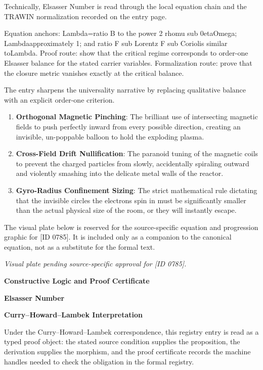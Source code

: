 Technically, Elsasser Number is read through the local equation chain and the TRAWIN normalization recorded on the entry page.

Equation anchors: Lambda=ratio B to the power 2 rhomu sub 0etaOmega; Lambdaapproximately 1; and ratio F sub Lorentz F sub Coriolis similar toLambda. Proof route: show that the critical regime corresponds to order-one Elsasser balance for the stated carrier variables. Formalization route: prove that the closure metric vanishes exactly at the critical balance.

The entry sharpens the universality narrative by replacing qualitative balance with an explicit order-one criterion.
\endgroup

\begin{enumerate}[leftmargin=1.6em,itemsep=6pt,topsep=4pt]
\item \textbf{Orthogonal Magnetic Pinching}: The brilliant use of intersecting magnetic fields to push perfectly inward from every possible direction, creating an invisible, un-poppable balloon to hold the exploding plasma.
\item \textbf{Cross-Field Drift Nullification}: The paranoid tuning of the magnetic coils to prevent the charged particles from slowly, accidentally spiraling outward and violently smashing into the delicate metal walls of the reactor.
\item \textbf{Gyro-Radius Confinement Sizing}: The strict mathematical rule dictating that the invisible circles the electrons spin in must be significantly smaller than the actual physical size of the room, or they will instantly escape.
\end{enumerate}

\begingroup\footnotesize\sloppy
The visual plate below is reserved for the source-specific equation and progression graphic for [ID 0785]. It is included only as a companion to the canonical equation, not as a substitute for the formal text.
\par\endgroup
\begingroup\footnotesize\itshape
Visual plate pending source-specific approval for [ID 0785].
\par\endgroup

\clearpage
\begingroup\tzpsupportsetup
\noindent\textbf{\fontsize{10.8pt}{12.8pt}\selectfont [ID 0785] Constructive Logic and Proof Certificate}\par
\noindent\textbf{\fontsize{10pt}{12pt}\selectfont Elsasser Number}\par
\vspace{0.45em}
\begingroup
\footnotesize
\setlength{\parskip}{0.22em}
\setlength{\parindent}{0pt}
\noindent\textbf{Curry--Howard--Lambek Interpretation}\par
Under the Curry--Howard--Lambek correspondence, this registry entry is read as a typed proof
object: the stated source condition supplies the proposition, the derivation supplies the
morphism, and the proof certificate records the machine handles needed to check the obligation
in the formal registry.


